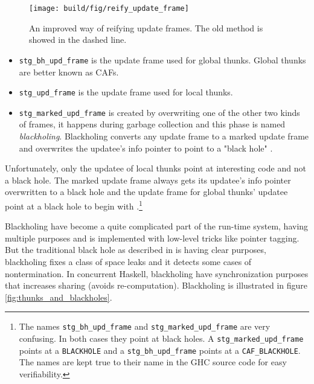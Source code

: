 \begin{figure}
\begin{mdframed}
  \texttt{[image: build/fig/reify\_update\_frame]}
  \caption{An improved way of reifying update frames. The old method is
  showed in the dashed line.}
  \label{fig:reify_update_frame}
\end{mdframed}
\end{figure}

\begin{itemize}
  \item
    \texttt{stg\_bh\_upd\_frame} is the update frame used for global
      thunks. Global thunks are better known as CAFs.
  \item
    \texttt{stg\_upd\_frame} is the update frame used for local
  thunks.
  \item
     \texttt{stg\_marked\_upd\_frame} is created
  by overwriting one of the other two kinds of frames, it
  happens during garbage collection and this phase is named
  \emph{blackholing}. Blackholing converts any update frame to a
  marked update frame \cite{github_overwrite_update_frame} and
  overwrites the updatee's info pointer to point to a "black hole"
  \cite{github_overwrite_blackhole}.
\end{itemize}

Unfortunately, only the updatee of local thunks point
at interesting code and not a black hole. The marked update frame
always gets its updatee's info pointer overwritten to a black
hole \cite{github_overwrite_blackhole} and the update frame
for global thunks' updatee point at a black hole to begin with
\cite{github_set_hdr_caf_blackhole}.\footnote{The names
  \texttt{stg\_bh\_upd\_frame} and \texttt{stg\_marked\_upd\_frame} are very
  confusing. In both cases they point at black holes. A
  \texttt{stg\_marked\_upd\_frame} points at a \texttt{BLACKHOLE} and a
  \texttt{stg\_bh\_upd\_frame} points at a \texttt{CAF\_BLACKHOLE}. The names
  are kept true to their name in the GHC source code for easy verifiability.}


Blackholing have become a quite complicated part of the run-time system,
having multiple purposes \cite{ghc_new_implementation_black_holes}
and is implemented with low-level tricks like pointer tagging. But the
traditional black hole as described in \cite{jones1992tail} is having
clear purposes, blackholing fixes a class of space leaks and it detects
some cases of nontermination. In concurrent Haskell, blackholing have
synchronization purposes that increases sharing (avoids re-computation). Blackholing
is illustrated in figure \ref{fig:thunks_and_blackholes}.

